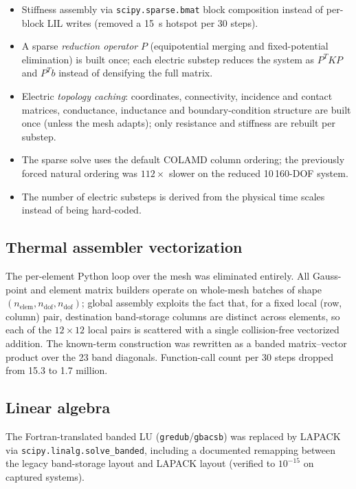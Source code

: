 \documentclass[11pt,a4paper]{article}
\newcommand{\code}[1]{\texttt{#1}}
\begin{document}
\begin{itemize}
  \item Stiffness assembly via \code{scipy.sparse.bmat} block composition instead of
        per-block LIL writes (removed a \SI{15}{s} hotspot per 30 steps).
  \item A sparse \emph{reduction operator} $P$ (equipotential merging and
        fixed-potential elimination) is built once; each electric substep reduces the
        system as $P^{T}KP$ and $P^{T}b$ instead of densifying the full matrix.
  \item Electric \emph{topology caching}: coordinates, connectivity, incidence and
        contact matrices, conductance, inductance and boundary-condition structure are
        built once (unless the mesh adapts); only resistance and stiffness are rebuilt
        per substep.
  \item The sparse solve uses the default COLAMD column ordering; the previously
        forced natural ordering was $112\times$ slower on the reduced
        10\,160-DOF system.
  \item The number of electric substeps is derived from the physical time scales
        instead of being hard-coded.
\end{itemize}

\subsection{Thermal assembler vectorization}

The per-element Python loop over the mesh was eliminated entirely. All Gauss-point and
element matrix builders operate on whole-mesh batches of shape
$(n_\mathrm{elem}, n_\mathrm{dof}, n_\mathrm{dof})$; global assembly exploits the fact
that, for a fixed local (row, column) pair, destination band-storage columns are
distinct across elements, so each of the $12\times12$ local pairs is scattered with a
single collision-free vectorized addition. The known-term construction was rewritten as
a banded matrix--vector product over the 23 band diagonals. Function-call count per
30 steps dropped from 15.3 to 1.7 million.

\subsection{Linear algebra}

The Fortran-translated banded LU (\code{gredub}/\code{gbacsb}) was replaced by
LAPACK via \code{scipy.linalg.solve\_banded}, including a documented remapping between
the legacy band-storage layout and LAPACK layout (verified to $10^{-15}$ on captured
systems).
\end{document}
